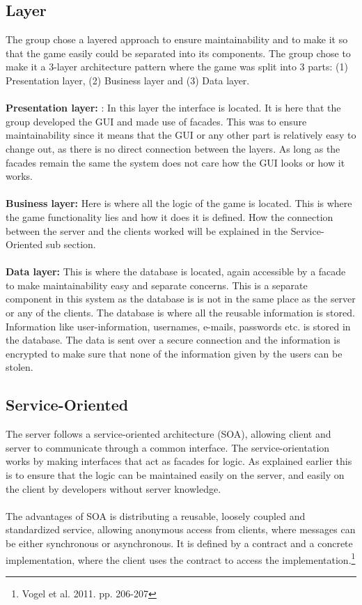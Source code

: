 \subsection{Layer}
The group chose a layered approach to ensure maintainability and to make it
so that the game easily could be separated into its components. The group
chose to make it a 3-layer architecture pattern where the game was split
into 3 parts: (1) Presentation layer, (2) Business layer and (3) Data layer.
\\
\\
\textbf{Presentation layer:} : In this layer the interface is located.
It is here that the group developed the GUI and made use of facades.
This was to ensure maintainability since it means that the GUI or any
other part is relatively easy to change out, as there is no direct
connection between the layers. As long as the facades remain the same
the system does not care how the GUI looks or how it works.
\\
\\
\textbf{Business layer:} Here is where all the logic of the game is
located. This is where the game functionality lies and how it does it
is defined. How the connection between the server and the clients worked
 will be explained in the Service-Oriented sub section.
\\
\\
\textbf{Data layer:} This is where the database is located, again
accessible by a facade to make maintainability easy and separate concerns.
 This is a separate component in this system as the database is is not in
 the same place as the server or any of the clients. The database is where
  all the reusable information is stored. Information like user-information,
  usernames, e-mails, passwords etc. is stored in the database. The data is
   sent over a secure connection and the information is encrypted to make sure
    that none of the information given by the users can be stolen.
\\
\subsection{Service-Oriented}
The server follows a service-oriented architecture (SOA), allowing client
 and server to communicate through a common interface.
 The service-orientation works by making interfaces that act as facades
  for logic. As explained earlier this is to ensure that the logic can
   be maintained easily on the server, and easily on the client by developers
    without server knowledge.
\\
\\
The advantages of SOA is distributing a reusable, loosely coupled and
 standardized service, allowing anonymous access from clients, where
  messages can be either synchronous or asynchronous. It is defined by
  a contract and a concrete implementation, where the client uses the
  contract to access the
  implementation.\footnote{Vogel et al. 2011. pp. 206-207}
\\
